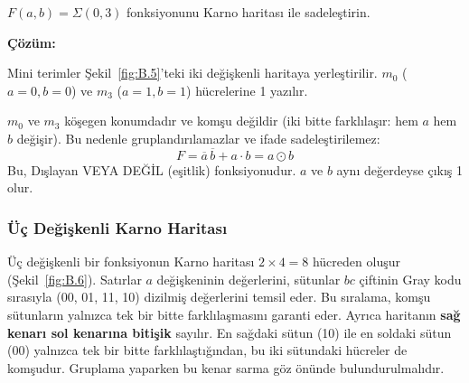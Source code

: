 \begin{ornek}[B.4]
$F(a,b) = \Sigma(0, 3)$ fonksiyonunu Karno haritası ile sadeleştirin.

\textbf{Çözüm:}

Mini terimler Şekil~\ref{fig:B.5}'teki iki değişkenli haritaya yerleştirilir. $m_0$ ($a=0, b=0$) ve $m_3$ ($a=1, b=1$) hücrelerine 1 yazılır.

\begin{center}
\end{center}

$m_0$ ve $m_3$ köşegen konumdadır ve komşu değildir (iki bitte farklılaşır: hem $a$ hem $b$ değişir). Bu nedenle gruplandırılamazlar ve ifade sadeleştirilemez:
\[
F = \overline{a}\,\overline{b} + a \cdot b = a \odot b
\]
Bu, Dışlayan VEYA DEĞİL (eşitlik) fonksiyonudur. $a$ ve $b$ aynı değerdeyse çıkış 1 olur.
\end{ornek}

\subsubsection{Üç Değişkenli Karno Haritası}

Üç değişkenli bir fonksiyonun Karno haritası $2 \times 4 = 8$ hücreden oluşur (Şekil~\ref{fig:B.6}). Satırlar $a$ değişkeninin değerlerini, sütunlar $bc$ çiftinin Gray kodu sırasıyla (00, 01, 11, 10) dizilmiş değerlerini temsil eder. Bu sıralama, komşu sütunların yalnızca tek bir bitte farklılaşmasını garanti eder. Ayrıca haritanın \textbf{sağ kenarı sol kenarına bitişik} sayılır. En sağdaki sütun (10) ile en soldaki sütun (00) yalnızca tek bir bitte farklılaştığından, bu iki sütundaki hücreler de komşudur. Gruplama yaparken bu kenar sarma göz önünde bulundurulmalıdır.

